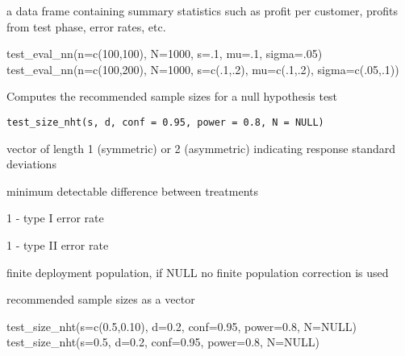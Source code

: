 \documentclass[a4paper]{book}
\begin{document}
%
\begin{Value}
a data frame containing summary statistics such as profit per customer,
profits from test phase, error rates, etc.
\end{Value}
%
\begin{Examples}
\begin{ExampleCode}
test_eval_nn(n=c(100,100), N=1000, s=.1, mu=.1, sigma=.05)
test_eval_nn(n=c(100,200), N=1000, s=c(.1,.2), mu=c(.1,.2), sigma=c(.05,.1))
\end{ExampleCode}
\end{Examples}
%
\begin{Description}\relax
Computes the recommended sample sizes for a null hypothesis test
\end{Description}
%
\begin{Usage}
\begin{verbatim}
test_size_nht(s, d, conf = 0.95, power = 0.8, N = NULL)
\end{verbatim}
\end{Usage}
%
\begin{Arguments}
\begin{ldescription}
\item[\code{s}] vector of length 1 (symmetric) or 2 (asymmetric) indicating
response standard deviations

\item[\code{d}] minimum detectable difference between treatments

\item[\code{conf}] 1 - type I error rate

\item[\code{power}] 1 - type II error rate

\item[\code{N}] finite deployment population, if NULL no finite population correction is used
\end{ldescription}
\end{Arguments}
%
\begin{Value}
recommended sample sizes as a vector
\end{Value}
%
\begin{Examples}
\begin{ExampleCode}
test_size_nht(s=c(0.5,0.10), d=0.2, conf=0.95, power=0.8, N=NULL)
test_size_nht(s=0.5, d=0.2, conf=0.95, power=0.8, N=NULL)
\end{ExampleCode}
\end{Examples}
\end{document}
